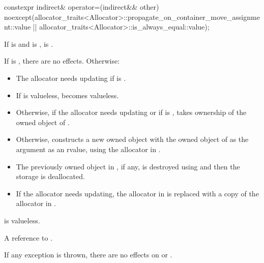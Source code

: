 %
\begin{itemdecl}
constexpr indirect& operator=(indirect&& other)
  noexcept(allocator_traits<Allocator>::propagate_on_container_move_assignment::value ||
           allocator_traits<Allocator>::is_always_equal::value);
\end{itemdecl}

\begin{itemdescr}
\pnum
\mandates
If
is  and
 is ,
 is .

\pnum
\effects
If  is , there are no effects.
Otherwise:

\begin{itemize}
\item
The allocator needs updating if
is .

\item
If  is valueless,
 becomes valueless.

\item
Otherwise,
if the allocator needs updating or
if  is ,
 takes ownership of the owned object of .

\item
Otherwise,
constructs a new owned object with
the owned object of  as the argument as an rvalue,
using the allocator in .

\item
The previously owned object in , if any,
is destroyed using  and
then the storage is deallocated.

\item
If the allocator needs updating,
the allocator in  is replaced with
a copy of the allocator in .
\end{itemize}

\pnum
\ensures
{} is valueless.

\pnum
\returns
A reference to .

\pnum
\remarks
If any exception is thrown,
there are no effects on  or .
\end{itemdescr}

